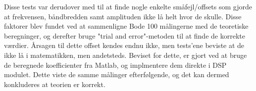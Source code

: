 Disse tests var derudover med til at finde nogle enkelte småfejl/offsets som gjorde at frekvensen, båndbredden samt amplituden ikke lå helt hvor de skulle. Disse faktorer blev fundet ved at sammenligne Bode 100 målingerne med de teoretiske beregninger, og derefter bruge "trial and error"-metoden til at finde de korrekte værdier. Årsagen til dette offset kendes endnu ikke, men tests'ene beviste at de ikke lå i matematikken, men andetsteds. 
Beviset for dette, er gjort ved at bruge de beregnede koefficienter fra Matlab, og implmentere dem direkte i DSP modulet. Dette viste de samme målinger efterfølgende, og det kan dermed konkluderes at teorien er korrekt.











